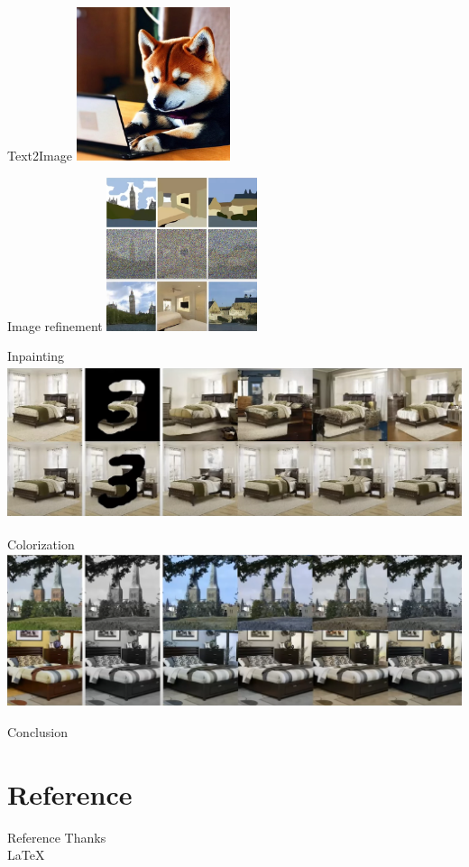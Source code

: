 \documentclass[aspectratio=169]{beamer}
\begin{document}
\begin{frame}{Text2Image}
    \centering
    \includegraphics[height=4.5cm]{../pic/dog-is-reading.png}
\end{frame}
\begin{frame}{Image refinement}
    \centering
    \includegraphics[height=4.5cm]{../pic/compose.png}
\end{frame}
\begin{frame}{Inpainting}
    \centering
    \includegraphics[height=4.5cm]{../pic/inpainting.png}
\end{frame}
\begin{frame}{Colorization}
    \centering
    \includegraphics[height=4.5cm]{../pic/colorization.png}
\end{frame}
\begin{frame}{Conclusion}

\end{frame}

\section{Reference}
\begin{frame}{Reference}
    Thanks\\
    \LaTeX
\end{frame}
\end{document}
